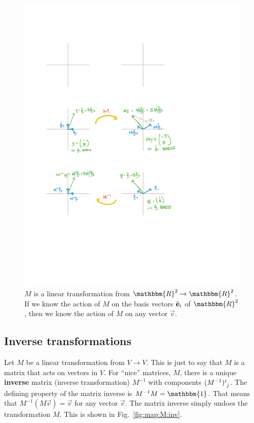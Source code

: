 \documentclass[12pt]{article}
\begin{document}
\begin{figure}[tb]
    \centering
    \includegraphics[width=.8\textwidth]{figures/maps_M.pdf}
    \caption{$M$ is a linear transformation from $\mathbbm{R}^2\to\mathbbm{R}^2$. If we know the action of $M$ on the basis vectors $\hat{\mathbf{e}}_i$ of $\mathbbm{R}^2$, then we know the action of $M$ on any vector $\vec{v}$.}
    \label{fig:map:M}
\end{figure}




\subsection{Inverse transformations}


Let $M$ be a linear transformation from $V\to V$. This is just to say that $M$ is a matrix that acts on vectors in $V$. For ``nice'' matrices, $M$, there is a unique \textbf{inverse} matrix (inverse transformation) $M^{-1}$ with components $(M^{-1})\aij{i}{j}$. The defining property of the matrix inverse is $M^{-1}M = \mathbbm{1}$. That means that $M^{-1}(M\vec{v})=\vec{v}$ for any vector $\vec{v}$. The matrix inverse simply undoes the transformation $M$. This is shown in Fig.~\ref{fig:map:M:inv}. 
\end{document}
